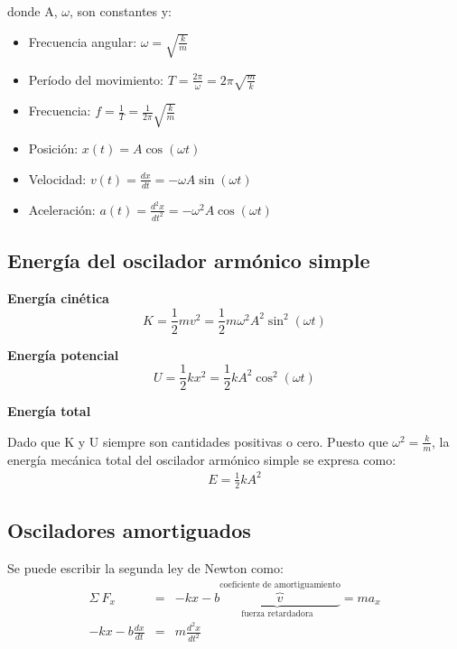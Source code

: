 \documentclass[12pt,a4paper]{article}
\newcommand{\PN}{\par\noindent}
\begin{document}
		\PN donde A, $\omega$, son constantes y:
		\begin{itemize}
			\item Frecuencia angular: $\omega = \sqrt{\frac{k}{m}}$
			\item Período del movimiento: $T = \frac{2\pi}{\omega} = 2\pi \sqrt{\frac{m}{k}}$
			\item Frecuencia: $f = \frac{1}{T} = \frac{1}{2\pi} \sqrt{\frac{k}{m}}$
			\item Posición: $x(t) = A \cos (\omega t)$
			\item Velocidad: $v(t) = \frac{dx}{dt} = - \omega A \sin (\omega t)$
			\item Aceleración: $a(t) = \frac{d^{2}x}{dt^{2}} = - \omega^{2} A \cos (\omega t)$
		\end{itemize}

	\subsection{Energía del oscilador armónico simple}
		\PN \textbf{Energía cinética}
		\begin{equation}
			K = \frac{1}{2} m v^{2} = \frac{1}{2} m \omega^{2} A^{2} \sin^{2} (\omega t)
		\end{equation}

		\PN \textbf{Energía potencial}
		\begin{equation}
			U = \frac{1}{2} k x^{2} = \frac{1}{2} k A^{2} \cos^{2} (\omega t)
		\end{equation}

		\PN \textbf{Energía total}
		\PN Dado que K y U siempre son cantidades positivas o cero. Puesto que $\omega^{2} = \frac{k}{m}$, la energía mecánica
		total del oscilador armónico simple se expresa como:
		\begin{eqnarray*}
			E = \frac{1}{2} k A^{2}
		\end{eqnarray*}

	\subsection{Osciladores amortiguados}
		\PN Se puede escribir la segunda ley de Newton como:
		\begin{eqnarray*}
			\Sigma \ F_{x} &=& -kx - \underbrace{b \overbrace{v}^{\text{coeficiente de amortiguamiento}}}_{\text{fuerza retardadora}} = ma_{x} \\
			-kx - b \frac{dx}{dt} &=& m \frac{d^{2}x}{dt^{2}}
		\end{eqnarray*}
\end{document}
